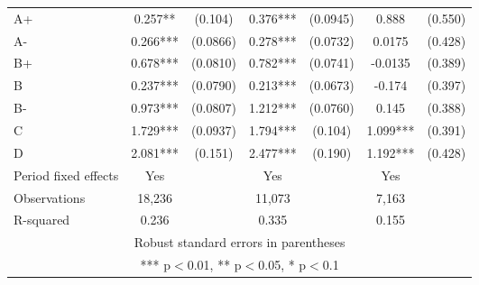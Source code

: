 \documentclass[12pt]{article}
\begin{document}
\begin{table}[H]
{\begin{tabular}{lcccccc}
    A+ & 0.257** & (0.104) & 0.376*** & (0.0945) & 0.888 & (0.550) \\
    A- & 0.266*** & (0.0866) & 0.278*** & (0.0732) & 0.0175 & (0.428) \\
    B+ & 0.678*** & (0.0810) & 0.782*** & (0.0741) & -0.0135 & (0.389) \\
    B  & 0.237*** & (0.0790) & 0.213*** & (0.0673) & -0.174 & (0.397) \\
    B- & 0.973*** & (0.0807) & 1.212*** & (0.0760) & 0.145 & (0.388) \\
    C  & 1.729*** & (0.0937) & 1.794*** & (0.104) & 1.099*** & (0.391) \\
    D  & 2.081*** & (0.151) & 2.477*** & (0.190) & 1.192*** & (0.428) \vspace{2mm} \\
    \midrule
    Period fixed effects & Yes & & Yes & & Yes & \\
    Observations & 18,236 & & 11,073 & & 7,163 & \\
    R-squared & 0.236 & & 0.335 & & 0.155 & \\
    \bottomrule
    \multicolumn{7}{c}{Robust standard errors in parentheses} \\
    \multicolumn{7}{c}{*** p$<$0.01, ** p$<$0.05, * p$<$0.1} \\
    \end{tabular}%
    }
\end{table}
\end{document}
